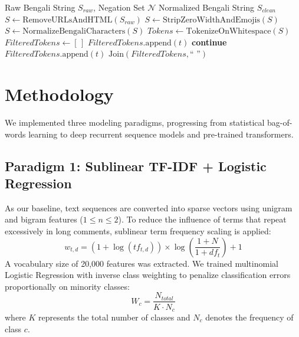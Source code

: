 \documentclass[11pt,a4paper]{article}
\begin{document}
\begin{algorithm}[htbp]
\caption{Negation-Preserving Text Normalization}
\label{alg:negation_clean}
\small
\begin{algorithmic}[1]
\Require Raw Bengali String $S_{raw}$, Negation Set $\mathcal{N}$
\Ensure Normalized Bengali String $S_{clean}$
\State $S \gets \text{RemoveURLsAndHTML}(S_{raw})$
\State $S \gets \text{StripZeroWidthAndEmojis}(S)$ 
\State $S \gets \text{NormalizeBengaliCharacters}(S)$
\State $Tokens \gets \text{TokenizeOnWhitespace}(S)$
\State $FilteredTokens \gets [\,]$
        \State $FilteredTokens.\text{append}(t)$ 
        \State \textbf{continue} 
    \Else
        \State $FilteredTokens.\text{append}(t)$
    \EndIf
\EndFor
\State \Return $\text{Join}(FilteredTokens, \text{`` ''})$
\end{algorithmic}
\end{algorithm}

\section{Methodology}
We implemented three modeling paradigms, progressing from statistical bag-of-words learning to deep recurrent sequence models and pre-trained transformers.

\subsection{Paradigm 1: Sublinear TF-IDF + Logistic Regression}
As our baseline, text sequences are converted into sparse vectors using unigram and bigram features ($1 \le n \le 2$). To reduce the influence of terms that repeat excessively in long comments, sublinear term frequency scaling is applied:
\begin{equation}
w_{t,d} = (1 + \log(tf_{t,d})) \times \log\left( \frac{1 + N}{1 + df_t} \right) + 1
\end{equation}
A vocabulary size of 20,000 features was extracted. We trained multinomial Logistic Regression with inverse class weighting to penalize classification errors proportionally on minority classes:
\begin{equation}
W_c = \frac{N_{total}}{K \cdot N_c}
\end{equation}
where $K$ represents the total number of classes and $N_c$ denotes the frequency of class $c$.
\end{document}
